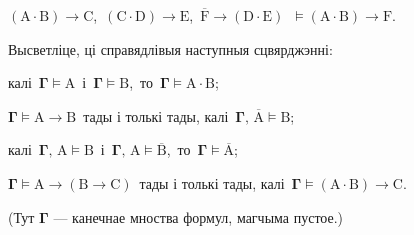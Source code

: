 \begin{problemList}
\begin{belarusianEnumerate}
\item $(\boldsymbol{\mathrm{A}} \cdot \boldsymbol{\mathrm{B}}) \to \boldsymbol{\mathrm{C}}$,\,
$(\boldsymbol{\mathrm{C}} \cdot \boldsymbol{\mathrm{D}}) \to \boldsymbol{\mathrm{E}}$,\,
$\overline{\boldsymbol{\mathrm{F}}} \to (\boldsymbol{\mathrm{D}} \cdot \boldsymbol{\mathrm{E}})$\,
$\vDash (\boldsymbol{\mathrm{A}} \cdot \boldsymbol{\mathrm{B}}) \to \boldsymbol{\mathrm{F}}$.

\end{belarusianEnumerate}

\smallskip

\item
Высветліце, ці справядлівыя наступныя сцвярджэнні: \\

\begin{belarusianEnumerate}

\item калі\, $\boldsymbol{\Gamma} \vDash \boldsymbol{\mathrm{A}}$\, і\, $\boldsymbol{\Gamma}
\vDash \boldsymbol{\mathrm{B}}$,\, то\, $\boldsymbol{\Gamma} \vDash \boldsymbol{\mathrm{A}} \cdot
\boldsymbol{\mathrm{B}}$;

\item $\boldsymbol{\Gamma} \vDash \boldsymbol{\mathrm{A}} \to \boldsymbol{\mathrm{B}}$\, тады
і толькі тады, калі\, $\boldsymbol{\Gamma},\, \overline{\boldsymbol{\mathrm{A}}} \vDash \boldsymbol{\mathrm{B}}$;

\item калі\, $\boldsymbol{\Gamma},\, \boldsymbol{\mathrm{A}} \vDash \boldsymbol{\mathrm{B}}$\, і\,
$\boldsymbol{\Gamma},\, \boldsymbol{\mathrm{A}} \vDash \overline{\boldsymbol{\mathrm{B}}}$,\, то\,
$\boldsymbol{\Gamma} \vDash \overline{\boldsymbol{\mathrm{A}}}$;

\item $\boldsymbol{\Gamma} \vDash \boldsymbol{\mathrm{A}} \to (\boldsymbol{\mathrm{B}}
\to \boldsymbol{\mathrm{C}})$\, тады і толькі тады, калі\, $\boldsymbol{\Gamma} \vDash (\boldsymbol{\mathrm{A}} \cdot \boldsymbol{\mathrm{B}}) \to \boldsymbol{\mathrm{C}}$.

\end{belarusianEnumerate}

(Тут $\boldsymbol{\Gamma}$ --- канечнае мноства формул, магчыма пустое.) \\

\end{problemList}


